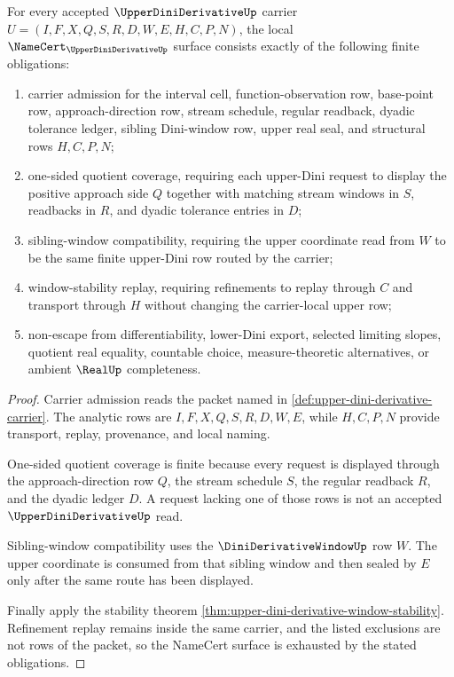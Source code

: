\begin{theorem}
\label{thm:upper-dini-derivative-namecert-obligations}
For every accepted $\UpperDiniDerivativeUp$ carrier $U=(I,F,X,Q,S,R,D,W,E,H,C,P,N)$, the local $\NameCert_{\UpperDiniDerivativeUp}$ surface consists exactly of the following finite obligations:
\begin{enumerate}
\item carrier admission for the interval cell, function-observation row, base-point row, approach-direction row, stream schedule, regular readback, dyadic tolerance ledger, sibling Dini-window row, upper real seal, and structural rows $H,C,P,N$;
\item one-sided quotient coverage, requiring each upper-Dini request to display the positive approach side $Q$ together with matching stream windows in $S$, readbacks in $R$, and dyadic tolerance entries in $D$;
\item sibling-window compatibility, requiring the upper coordinate read from $W$ to be the same finite upper-Dini row routed by the carrier;
\item window-stability replay, requiring refinements to replay through $C$ and transport through $H$ without changing the carrier-local upper row;
\item non-escape from differentiability, lower-Dini export, selected limiting slopes, quotient real equality, countable choice, measure-theoretic alternatives, or ambient $\RealUp$ completeness.
\end{enumerate}
\end{theorem}
\begin{proof}
Carrier admission reads the packet named in \autoref{def:upper-dini-derivative-carrier}. The analytic rows are $I,F,X,Q,S,R,D,W,E$, while $H,C,P,N$ provide transport, replay, provenance, and local naming.

One-sided quotient coverage is finite because every request is displayed through the approach-direction row $Q$, the stream schedule $S$, the regular readback $R$, and the dyadic ledger $D$. A request lacking one of those rows is not an accepted $\UpperDiniDerivativeUp$ read.

Sibling-window compatibility uses the $\DiniDerivativeWindowUp$ row $W$. The upper coordinate is consumed from that sibling window and then sealed by $E$ only after the same route has been displayed.

Finally apply the stability theorem \autoref{thm:upper-dini-derivative-window-stability}. Refinement replay remains inside the same carrier, and the listed exclusions are not rows of the packet, so the NameCert surface is exhausted by the stated obligations.
\end{proof}


